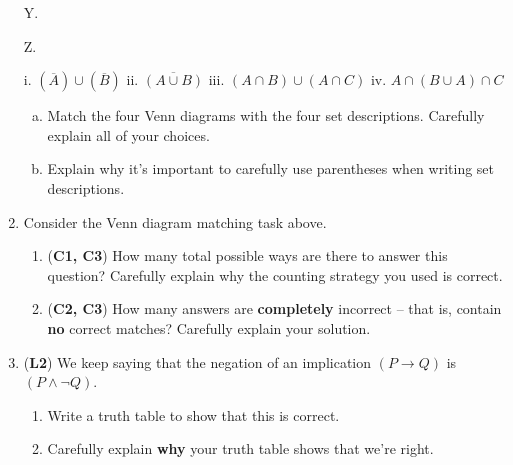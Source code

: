 \documentclass[12pt]{article}
\def\firstcircle{(90:1cm) circle (1.5cm)}
\def\secondcircle{(210:1cm) circle (1.5cm)}
\def\thirdcircle{(330:1cm) circle (1.5cm)}
\def\universer{(-3, -2.5) rectangle (3, 2.75)}
\begin{document}
\begin{enumerate}
\hfill
Y.
\hfill
Z. 

i. $(\overline{A}) \cup (\overline{B})$
\hfill
ii. $\overline{(A \cup B)}$
\hfill
iii. $(A\cap B) \cup (A \cap C)$
\hfill
iv. $A\cap (B\cup A) \cap C$

\begin{enumerate}[(a)]
    \item Match the four Venn diagrams with the four set descriptions. Carefully explain all of your choices.
    \item Explain why it's important to carefully use parentheses when writing set descriptions.
\end{enumerate}

\item Consider the Venn diagram matching task above.
\begin{enumerate}
    \item (\textbf{C1, C3}) How many total possible ways are there to answer this question? Carefully explain why the counting strategy you used is correct.
    \item (\textbf{C2, C3}) How many answers are \textbf{completely} incorrect -- that is, contain \textbf{no} correct matches? Carefully explain your solution.
\end{enumerate}

\item (\textbf{L2}) We keep saying that the negation of an implication $(P \to Q)$ is $(P \land \lnot Q)$. 
\begin{enumerate}
    \item Write a truth table to show that this is correct.
    \item Carefully explain \textbf{why} your truth table shows that we're right.
\end{enumerate}




\end{enumerate}
\end{document}
